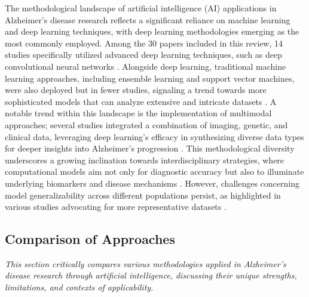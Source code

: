 \documentclass{MITcsail}
\begin{document}
The methodological landscape of artificial intelligence (AI) applications in Alzheimer's disease research reflects a significant reliance on machine learning and deep learning techniques, with deep learning methodologies emerging as the most commonly employed. Among the 30 papers included in this review, 14 studies specifically utilized advanced deep learning techniques, such as deep convolutional neural networks \citep{ref_10_1016_j_neuroimage_2020_117203,ref_10_1016_j_irbm_2020_06_006}. Alongside deep learning, traditional machine learning approaches, including ensemble learning and support vector machines, were also deployed but in fewer studies, signaling a trend towards more sophisticated models that can analyze extensive and intricate datasets \citep{ref_10_3389_fpubh_2022_853294,ref_10_1007_s44174_023_00078_9}. A notable trend within this landscape is the implementation of multimodal approaches; several studies integrated a combination of imaging, genetic, and clinical data, leveraging deep learning's efficacy in synthesizing diverse data types for deeper insights into Alzheimer's progression \citep{ref_10_1093_jamia_ocac168,ref_10_3389_fpubh_2022_834032}. This methodological diversity underscores a growing inclination towards interdisciplinary strategies, where computational models aim not only for diagnostic accuracy but also to illuminate underlying biomarkers and disease mechanisms \citep{ref_10_1002_alz_13390}. However, challenges concerning model generalizability across different populations persist, as highlighted in various studies advocating for more representative datasets \citep{ref_10_1016_s2589_7500_22_00169_8,ref_10_1016_j_ejrad_2023_110934}.

\subsection{Comparison of Approaches}

\textit{This section critically compares various methodologies applied in Alzheimer's disease research through artificial intelligence, discussing their unique strengths, limitations, and contexts of applicability.}
\end{document}
